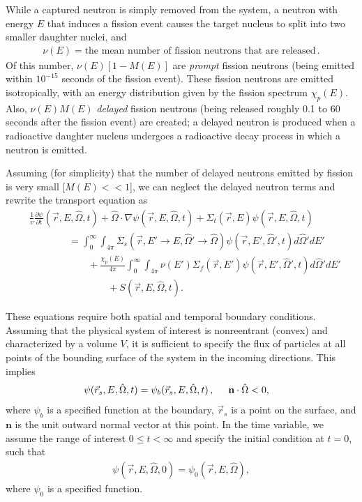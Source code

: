 \documentclass[12pt]{article}
\newcommand{\rvec}{\ensuremath{\vec{r}}}
\newcommand{\omvec}{\ensuremath{\hat{\Omega}}}
\begin{document}
While a captured neutron is simply removed from the system, a neutron with energy $E$ that induces a fission event causes the target nucleus to split into two smaller daughter nuclei, and 
\begin{align*}
\nu(E) = \textrm{the mean number of fission neutrons that are released}\,.
\end{align*}
Of this number, $\nu(E)[1-M(E)]$ are \textit{prompt} fission neutrons (being emitted within $10^{-15}$ seconds of the fission event). These fission neutrons are emitted isotropically, with an energy distribution given by the fission spectrum $\chi_p(E)$. Also, $\nu(E)M(E)$ \textit{delayed} fission neutrons (being released roughly 0.1 to 60 seconds after the fission event) are created; a delayed neutron is produced when a radioactive daughter nucleus undergoes a radioactive decay process in which a neutron is emitted. 

Assuming (for simplicity) that the number of delayed neutrons emitted by fission is very small [$M(E)<<1$], we can neglect the delayed neutron terms and rewrite
the transport equation as
\begin{align}
&\frac{1}{v}\frac{\partial \psi}{\partial t}(\rvec,E,\omvec,t) + \omvec\cdot  \nabla \psi(\rvec,E,\omvec,t) +
 \Sigma_t(\rvec,E)\psi(\rvec,E,\omvec,t) 
\\& \quad\quad\quad\quad =
\int_0^{\infty}\int_{4\pi}\Sigma_s(\rvec, E'\rightarrow E,\omvec'\rightarrow\omvec)
\psi(\rvec,E',\omvec',t)d\omvec'dE'\nonumber
\\&\quad\quad\quad\quad\quad\quad +\frac{\chi_p(E)}{4\pi}\int_0^{\infty}\int_{4\pi}\nu(E')\Sigma_f(\rvec,E')
\psi(\rvec,E',\omvec',t)d\omvec'dE'\nonumber
\\&\quad\quad\quad\quad\quad\quad\quad\quad+S(\rvec, E, \omvec,t) \nonumber.
\end{align}
   
These equations require both spatial and temporal boundary conditions.
Assuming that the
physical
system of interest is nonreentrant (convex) and characterized by a
volume $V$, it is sufficient to specify the flux of
particles at all points of the bounding surface of the system in the incoming
directions. This implies
\begin{align*}
\psi(\rvec_s, E,\omvec,t) &= \psi_b(\rvec_s,E,\omvec,t)\,, \hspace{0.5 cm} \textbf{n} \cdot \omvec <0,
\end{align*}
 where $\psi_b$ is a specified function at the boundary, $\rvec_s$ is a point on the surface, and $\textbf{n}$ is the unit
outward normal vector at this point. In the time variable, we assume the range of
interest $0\leq t<\infty$ and specify the
initial condition at $t=0$, such that
\begin{align*}
\psi(\rvec,E,\omvec,0) = \psi_0(\rvec,E,\omvec),
\end{align*}
 where $\psi_0$ is a specified function.
 
\end{document}
